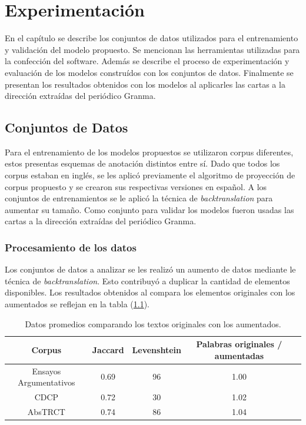 \chapter{Experimentación}\label{chapter:implementation}

En el capítulo se describe los conjuntos de datos utilizados para el entrenamiento y validación del modelo 
propuesto. Se mencionan las herramientas utilizadas para la confección del software. Además se describe el 
proceso de experimentación y evaluación de los modelos construídos con los conjuntos de datos. Finalmente
se presentan los resultados obtenidos con los modelos al aplicarles las cartas a la dirección extraídas 
del periódico Granma. 

\section{Conjuntos de Datos}

Para el entrenamiento de los modelos propuestos se utilizaron corpus diferentes, estos
presentas esquemas de anotación distintos entre sí. Dado que todos los corpus estaban en inglés, 
se les aplicó previamente el algoritmo de proyección de corpus propuesto y se crearon sus respectivas
versiones en español. A los conjuntos de entrenamientos se le aplicó la técnica de \emph{backtranslation}
para aumentar su tamaño. Como conjunto para validar los modelos fueron usadas las cartas a la dirección
extraídas del periódico Granma.

\subsection{Procesamiento de los datos}

Los conjuntos de datos a analizar se les realizó un aumento de datos mediante le técnica de \emph{backtranslation}.
Esto contribuyó a duplicar la cantidad de elementos disponibles. Los resultados obtenidos al compara los 
elementos originales con los aumentados se reflejan en la tabla (\ref{fig:data_augmentation}).

\begin{table}[h!]
	\begin{center}
		\begin{tabular}{|c|c|c|c|c|} \hline
		Corpus		            &  Jaccard	& Levenshtein	& Palabras originales / aumentadas   \\ \hline
        Ensayos Argumentativos	&  0.69		                & 96		                    & 1.00	  \\ \hline
		CDCP                    &  0.72	                    & 30		                    & 1.02	  \\ \hline
        AbsTRCT                 &  0.74		                & 86		                    & 1.04	  \\ \hline
		\end{tabular}
	\caption{Datos promedios comparando los textos originales con los aumentados.}\label{fig:data_augmentation}
	\end{center}
\end{table}

